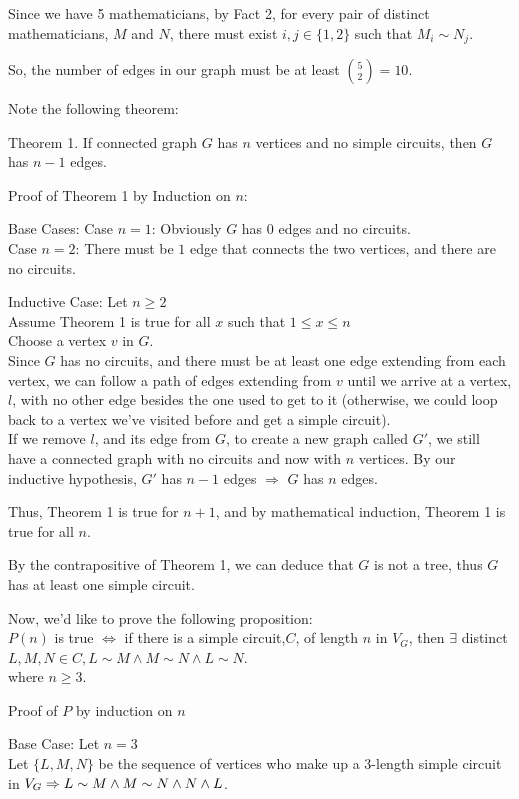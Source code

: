 \documentclass[fleqn]{article}
\begin{document}
Since we have 5 mathematicians, by Fact 2, for every pair of distinct mathematicians, $M$ and $N$, there must exist $i,j \in \lbrace 1,2 \rbrace$ such that $M_i \sim N_j$.

So, the number of edges in our graph must be at least ${5 \choose 2} = 10$.

Note the following theorem:

Theorem 1.
If connected graph $G$ has $n$ vertices and no simple circuits,
then $G$ has $n-1$ edges.

Proof of Theorem 1 by Induction on $n$:

Base Cases:
Case $n = 1$: Obviously $G$ has 0 edges and no circuits.\\
Case $n = 2$: There must be $1$ edge that connects the two vertices, and there are no circuits.

Inductive Case: Let $n \geq 2$\\
Assume Theorem 1 is true for all $x$ such that $1 \leq x \leq n$\\
Choose a vertex $v$ in $G$.\\
Since $G$ has no circuits, and there must be at least one edge extending from each vertex, we can follow a path of edges extending from $v$ until we arrive at a vertex, $l$,  with no other edge besides the one used to get to it (otherwise, we could loop back to a vertex we've visited before and get a simple circuit).\\
If we remove $l$, and its edge from $G$, to create a new graph called $G'$, we still have a connected graph with no circuits and now with $n$ vertices. By our inductive hypothesis, $G'$ has $n-1$ edges $\Rightarrow$ $G$ has $n$ edges.

Thus, Theorem 1 is true for $n+1$, and by mathematical induction, Theorem 1 is true for all $n$.
 
By the contrapositive of Theorem 1, we can deduce that $G$ is not a tree, thus $G$ has at least one simple circuit.

Now, we'd like to prove the following proposition:\\
$P(n)$ is true $\Leftrightarrow$ if there is a simple circuit,$C$, of length $n$ in $V_G$, then $\exists$ distinct $ L,M,N \in C,
                        L \sim M \wedge M \sim N \wedge L \sim N$.\\
where $n \geq 3$.

Proof of $P$ by induction on $n$

Base Case: Let $n = 3$\\
Let $\lbrace L, M, N \rbrace$ be the sequence of vertices who make up a 3-length simple circuit in $V_G \Rightarrow\\
L \sim M \wedge M \sim N \wedge N \wedge L$.
\end{document}
